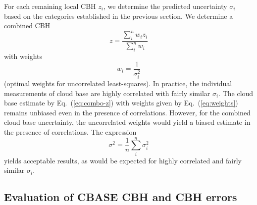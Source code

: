 \documentclass[essd,manuscript]{copernicus}\usepackage[]{graphicx}\usepackage[]{color}
\newcommand{\hlnum}[1]{\textcolor[rgb]{0.686,0.059,0.569}{#1}}%
\newcommand\comment[2]{\{\hlnum{ \textit{#1}: #2}\}}
\newcommand\commentjm[1]{\comment{$j_\mu$}{#1}}
\begin{document}
For each remaining local CBH $z_i$, we determine the predicted
uncertainty $\sigma_i$ based on the categories established in the previous
section.  We determine a combined CBH
\begin{equation}
  \label{eq:combo-z}
  z = \frac{\sum\limits_i^n w_i z_i}{\sum\limits_i^n w_i}
\end{equation}
with weights
\begin{equation}
  \label{eq:weights}
  w_i = \frac 1 {\sigma_i^2}
\end{equation}
(optimal weights for uncorrelated least-squares).  In practice, the individual
measurements of cloud base are highly correlated with fairly similar
$\sigma_i$.  The cloud base estimate by Eq.~(\ref{eq:combo-z}) with weights
given by Eq.~(\ref{eq:weights}) remains unbiased even in the presence of
correlations.  However, for the combined cloud base uncertainty,
the uncorrelated weights would yield a biased estimate in the presence of
correlations.  The expression
\begin{equation}
  \label{eq:combo-sigma}
  \sigma^2 = \frac 1 n \sum\limits_i^n \sigma_i^2
\end{equation}
yields acceptable results, as would be expected for highly correlated and fairly
similar $\sigma_i$.  


\subsection{Evaluation of CBASE CBH and CBH errors}
\label{sec:algorithm:eval}
\end{document}
